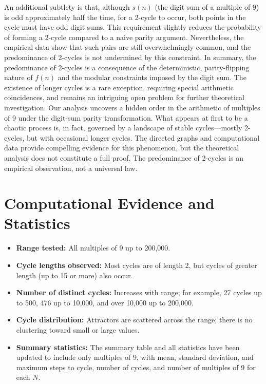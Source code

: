 \documentclass[12pt]{article}
\begin{document}
An additional subtlety is that, although $s(n)$ (the digit sum of a multiple of 9) is odd approximately half the time, for a 2-cycle to occur, both points in the cycle must have odd digit sums. This requirement slightly reduces the probability of forming a 2-cycle compared to a naive parity argument. Nevertheless, the empirical data show that such pairs are still overwhelmingly common, and the predominance of 2-cycles is not undermined by this constraint. In summary, the predominance of 2-cycles is a consequence of the deterministic, parity-flipping nature of $f(n)$ and the modular constraints imposed by the digit sum. The existence of longer cycles is a rare exception, requiring special arithmetic coincidences, and remains an intriguing open problem for further theoretical investigation.
Our analysis uncovers a hidden order in the arithmetic of multiples of 9 under the digit-sum parity transformation. What appears at first to be a chaotic process is, in fact, governed by a landscape of stable cycles---mostly 2-cycles, but with occasional longer cycles. The directed graphs and computational data provide compelling evidence for this phenomenon, but the theoretical analysis does not constitute a full proof. The predominance of 2-cycles is an empirical observation, not a universal law.

\section{Computational Evidence and Statistics}
\begin{itemize}
    \item \textbf{Range tested:} All multiples of 9 up to 200,000.
    \item \textbf{Cycle lengths observed:} Most cycles are of length 2, but cycles of greater length (up to 15 or more) also occur.
    \item \textbf{Number of distinct cycles:} Increases with range; for example, 27 cycles up to 500, 476 up to 10,000, and over 10,000 up to 200,000.
    \item \textbf{Cycle distribution:} Attractors are scattered across the range; there is no clustering toward small or large values.
    \item \textbf{Summary statistics:} The summary table and all statistics have been updated to include only multiples of 9, with mean, standard deviation, and maximum steps to cycle, number of cycles, and number of multiples of 9 for each $N$.
\end{itemize}
\end{document}
